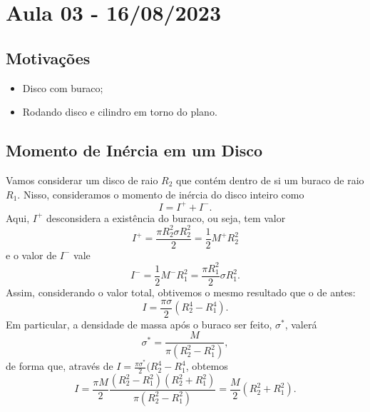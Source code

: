 \documentclass[physicsII_notes.tex]{subfiles}
\begin{document}
\section{Aula 03 - 16/08/2023}
\subsection{Motivações}
\begin{itemize}
	\item Disco com buraco;
	\item Rodando disco e cilindro em torno do plano.
\end{itemize}
\subsection{Momento de Inércia em um Disco}
Vamos considerar um disco de raio \(R_{2}\) que contém dentro de si um buraco de
raio \(R_{1}\). Nisso, consideramos o momento de inércia do disco inteiro como
\[
	I = I^{+} + I^{-}.
\]
Aqui, \(I^{+}\) desconsidera a existência do buraco, ou seja, tem valor
\[
	I^{+} = \frac{\pi R_{2}^{2}\sigma R_{2}^{2}}{2} = \frac{1}{2}M^{+}R_{2}^{2}
\]
e o valor de \(I^{-}\) vale
\[
	I^{-} = \frac{1}{2}M^{-}R_{1}^{2} = \frac{\pi R_{1}^{2}}{2}\sigma R_{1}^{2}.
\]
Assim, considerando o valor total, obtivemos o mesmo resultado que o de antes:
\[
	I = \frac{\pi \sigma }{2}(R_{2}^{4} - R_{1}^{4}).
\]
Em particular, a densidade de massa após o buraco ser feito, \(\sigma^{*} \), valerá
\[
	\sigma ^{*} = \frac{M}{\pi(R_{2}^{2} - R_{1}^{2})},
\]
de forma que, através de \(I = \frac{\pi \sigma^{*}}{2}(R_{2}^{4} - R_{1}^{4}\), obtemos
\[
	I = \frac{\pi M}{2} \frac{(R_{2}^{2}-R_{1}^{2})(R_{2}^{2}+R_{1}^{2})}{\pi (R_{2}^{2}-R_{1}^{2})} = \frac{M}{2}(R_{2}^{2}+R_{1}^{2}).
\]
\end{document}
